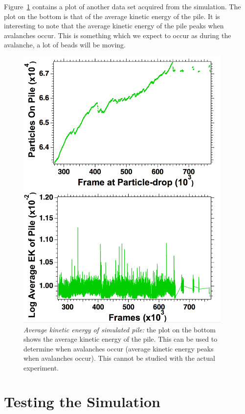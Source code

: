 \documentclass{book}
\begin{document}
Figure~\ref{fig:energy} contains a plot of another data set acquired from the simulation. The plot on the bottom is that of the average kinetic energy of the pile. It is interesting to note that the average kinetic energy of the pile peaks when avalanches occur. This is something which we expect to occur as during the avalanche, a lot of beads will be moving. 
\begin{figure}[h]
	\centering
	\includegraphics[width=0.95\textwidth]{Figures/Results/energy/e1}
	\caption[Average kinetic energy of simulated pile ]{\textit{Average kinetic energy of simulated pile:} the plot on the bottom shows the average kinetic energy of the pile. This can be used to determine when avalanches occur (average kinetic energy peaks when avalanches occur). This cannot be studied with the actual experiment. }
	\label{fig:energy}
\end{figure}


\section{Testing the Simulation}
\end{document}
